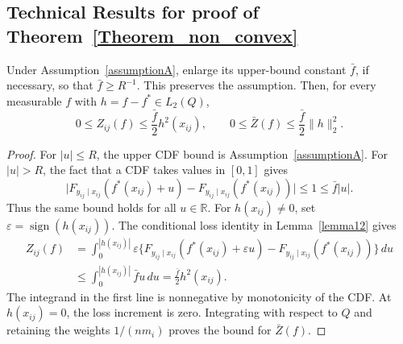 \documentclass[twoside,11pt]{article}
\newenvironment{revision}{\color{revisionred}}{}
\begin{document}
\subsection{Technical Results for proof of Theorem~\ref{Theorem_non_convex}}
\begin{revision}
\begin{lemma}
\label{lemma14_upper}
Under Assumption~\ref{assumptionA}, enlarge its upper-bound constant
$\bar f$, if necessary, so that $\bar f\geq R^{-1}$.
This preserves the assumption. Then, for every measurable $f$ with
$h=f-f^*\in L_2(Q)$,
\[
0\leq Z_{ij}(f)\leq\frac{\bar f}{2}h^2(x_{ij}),
\qquad
0\leq\bar Z(f)\leq\frac{\bar f}{2}\|h\|_2^2.
\]
\end{lemma}
\begin{proof}
For $|u|\leq R$, the upper CDF bound is Assumption~\ref{assumptionA}.
For $|u|>R$, the fact that a CDF takes values in $[0,1]$ gives
\[
\bigl|F_{y_{ij}\mid x_{ij}}(f^*(x_{ij})+u)
       -F_{y_{ij}\mid x_{ij}}(f^*(x_{ij}))\bigr|
\leq1\leq\bar f|u|.
\]
Thus the same bound holds for all $u\in\mathbb R$.
For $h(x_{ij})\ne0$, set $\varepsilon=\operatorname{sign}(h(x_{ij}))$.
The conditional loss identity in Lemma~\ref{lemma12} gives
\begin{align*}
Z_{ij}(f)
&=\int_0^{|h(x_{ij})|}\varepsilon
\bigl\{F_{y_{ij}\mid x_{ij}}(f^*(x_{ij})+\varepsilon u)
       -F_{y_{ij}\mid x_{ij}}(f^*(x_{ij}))\bigr\}\,du\\
&\leq\int_0^{|h(x_{ij})|}\bar f u\,du
=\frac{\bar f}{2}h^2(x_{ij}).
\end{align*}
The integrand in the first line is nonnegative by monotonicity of
the CDF. At $h(x_{ij})=0$, the loss increment is zero.
Integrating with respect to $Q$ and retaining the weights
$1/(nm_i)$ proves the bound for $\bar Z(f)$.
\end{proof}
\end{revision}
\end{document}

